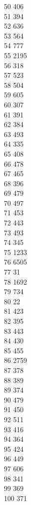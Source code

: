 { 50	406 \\
 51	394 \\
 52	636 \\
 53	564 \\
 54	777 \\
 55	2195 \\
 56	318 \\
 57	523 \\
 58	504 \\
 59	605 \\
 60	307 \\
 61	391 \\
 62	384 \\
 63	493 \\
 64	335 \\
 65	408 \\
 66	478 \\
 67	465 \\
 68	396 \\
 69	479 \\
 70	497 \\
 71	453 \\
 72	443 \\
 73	493 \\
 74	345 \\
 75	1233 \\
 76	6505 \\
 77	31 \\
 78	1692 \\
 79	734 \\
 80	22 \\
 81	423 \\
 82	395 \\
 83	443 \\
 84	430 \\
 85	455 \\
 86	2759 \\
 87	378 \\
 88	389 \\
 89	374 \\
 90	479 \\
 91	450 \\
 92	511 \\
 93	416 \\
 94	364 \\
 95	424 \\
 96	449 \\
 97	606 \\
 98	341 \\
 99	369 \\
 100	371 \\
}
